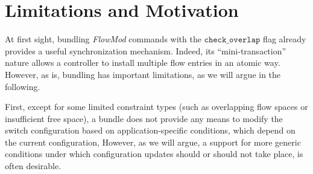 \documentclass[conference]{sigcomm-alternate}
\newcommand{\checko}{\texttt{check\_overlap}\xspace}
\newcommand{\stefan}[1]{\textit{\textcolor{red}{[stefan]: #1}}} %
\newcommand{\petr}[1]{\textit{\textcolor{blue}{[petr]: #1}}} %
\begin{document}
%



\section{Limitations and Motivation}\label{sec:motivation}


At first sight, bundling \emph{FlowMod} commands with  the $\checko$
flag already provides a useful synchronization mechanism.
Indeed, its ``mini-transaction'' nature allows a controller
to install multiple flow entries in an atomic way. 
However, as is,
bundling has important limitations, as we will argue in the following.

First, %
except for some limited constraint types (such as
overlapping flow spaces or insufficient free space),
a bundle does not provide any means to modify the switch configuration
based on application-specific conditions, which depend on the
current configuration, 
However, as we will argue, a support for more generic conditions under which configuration
updates
should or should not take place, is often desirable.
\end{document}

